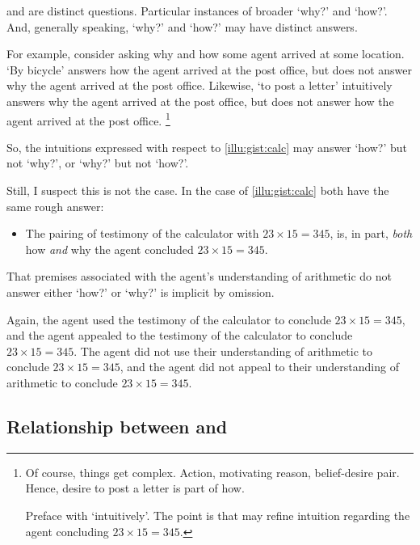 \begin{note}
  \qWhy{} and \qHow{} are distinct questions.
  Particular instances of broader `why?' and `how?'.
  And, generally speaking, `why?' and `how?' may have distinct answers.

  For example, consider asking why and how some agent arrived at some location.
  `By bicycle' answers how the agent arrived at the post office, but does not answer why the agent arrived at the post office.
  Likewise, `to post a letter' intuitively answers why the agent arrived at the post office, but does not answer how the agent arrived at the post office.%
  \footnote{
    Of course, things get complex.
    Action, motivating reason, belief-desire pair.
    Hence, desire to post a letter is part of how.

    Preface with `intuitively'.
    The point is that may refine intuition regarding the agent concluding \(23 \times 15 = 345\).
  }

  So, the intuitions expressed with respect to \autoref{illu:gist:calc} may answer `how?' but not `why?', or `why?' but not `how?'.

  Still, I suspect this is not the case.
  In the case of \autoref{illu:gist:calc} both have the same rough answer:

  \begin{itemize}
  \item
    The pairing of testimony of the calculator with \(23 \times 15 = 345\), is, in part, \emph{both} how \emph{and} why the agent concluded \(23 \times 15 = 345\).
  \end{itemize}
  That premises associated with the agent's understanding of arithmetic do not answer either `how?' or `why?' is implicit by omission.

  Again, the agent used the testimony of the calculator to conclude \(23 \times 15 = 345\), and the agent appealed to the testimony of the calculator to conclude \(23 \times 15 = 345\).
  The agent did not use their understanding of arithmetic to conclude \(23 \times 15 = 345\), and the agent did not appeal to their understanding of arithmetic to conclude \(23 \times 15 = 345\).
\end{note}

\subsection{Relationship between \qWhy{} and \qHow{}}

